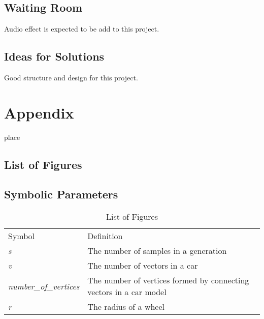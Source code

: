 \documentclass[12pt, titlepage]{article}
\begin{document}
\subsection{Waiting Room}
Audio effect is expected to be add to this project.

\subsection{Ideas for Solutions}
Good structure and design for this project.






\newpage

\section{Appendix}

place

\subsection{List of Figures}

\subsection{Symbolic Parameters}

\begin{table}[h!]
\centering
\label{LOF}
\begin{tabular}{ll}
Symbol & Definition \\
\textit{s} & The number of samples in a generation  \\
\textit{v} & The number of vectors in a car  \\
\textit{number\_of\_vertices} & The number of vertices formed by connecting vectors in a car model \\
\textit{r} & The radius of a wheel
\end{tabular}
\caption{List of Figures}
\end{table}
\end{document}
